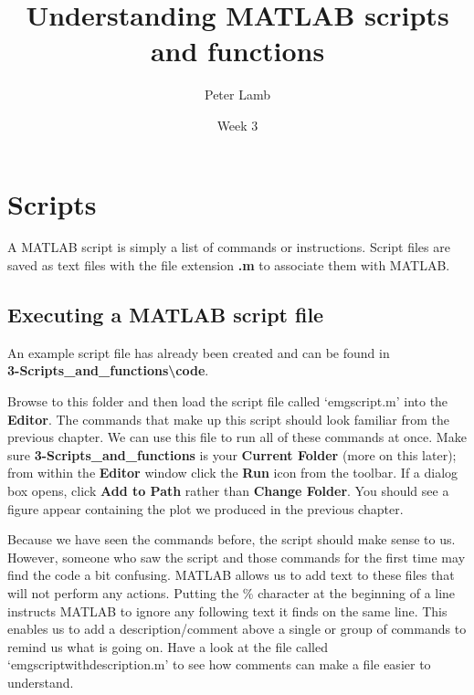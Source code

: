 \documentclass[12pt,a4paper]{article}
\title{Understanding MATLAB scripts and functions}
\author{Peter Lamb}
\date{Week 3}
\begin{document}
\maketitle


\section{Scripts}
A MATLAB script is simply a list of commands or instructions.  
Script files are saved as text files with the file extension \textbf{.m} to associate them with MATLAB.

\subsection{Executing a MATLAB script file}
An example script file has already been created and can be found in\\
\textbf{3-Scripts\_and\_functions\textbackslash code}.

Browse to this folder and then load the script file called `emgscript.m' into the \textbf{Editor}. %
The commands that make up this script should look familiar from the previous chapter.  
We can use this file to run all of these commands at once.  
Make sure \textbf{3-Scripts\_and\_functions} is your \textbf{Current Folder} (more on this later); from within the \textbf{Editor} window click the \textbf{Run} icon from the toolbar.
If a dialog box opens, click \textbf{Add to Path} rather than \textbf{Change Folder}.  
You should see a figure appear containing the plot we produced in the previous chapter.


Because we have seen the commands before, the script should make sense to us.  
However, someone who saw the script and those commands for the first time may find the code a bit confusing.  
MATLAB allows us to add text to these files that will not perform any actions.  
Putting the \textcolor{OliveGreen}{\%} character at the beginning of a line instructs MATLAB to ignore any following text it finds on the same line.  
This enables us to add a description/comment above a single or group of commands to remind us what is going on.  
Have a look at the file called `emgscriptwithdescription.m' to see how comments can make a file easier to understand.
\end{document}
